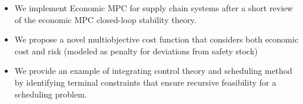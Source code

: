 \documentclass[10pt]{article}
\begin{document}
\begin{itemize}
\item We implement Economic MPC for supply chain systems after a short
  review of the economic MPC closed-loop stability theory.
\item We propose a novel multiobjective cost function that considers
  both economic cost and risk (modeled as penalty for deviations from safety stock)
\item We provide an example of integrating control theory and
  scheduling method by identifying terminal constraints that ensure
  recursive feasibility for a scheduling problem.
\end{itemize}
\end{document}
